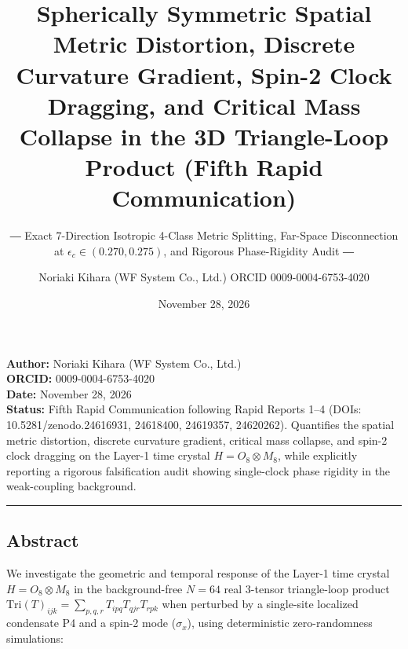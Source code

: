\documentclass[
  a4paper,
]{article}
\title{Spherically Symmetric Spatial Metric Distortion, Discrete
Curvature Gradient, Spin-2 Clock Dragging, and Critical Mass Collapse in
the 3D Triangle-Loop Product (Fifth Rapid Communication)}
\subtitle{― Exact 7-Direction Isotropic 4-Class Metric Splitting,
Far-Space Disconnection at \(\epsilon_c \in (0.270, 0.275)\), and
Rigorous Phase-Rigidity Audit ―}
\author{Noriaki Kihara (WF System Co., Ltd.) ORCID 0009-0004-6753-4020}
\date{November 28, 2026}
\begin{document}
\maketitle

\textbf{Author:} Noriaki Kihara (WF System Co., Ltd.)\\
\textbf{ORCID:} 0009-0004-6753-4020\\
\textbf{Date:} November 28, 2026\\
\textbf{Status:} Fifth Rapid Communication following Rapid Reports 1--4
(DOIs: 10.5281/zenodo.24616931, 24618400, 24619357, 24620262).
Quantifies the spatial metric distortion, discrete curvature gradient,
critical mass collapse, and spin-2 clock dragging on the Layer-1 time
crystal \(H = O_8 \otimes M_8\), while explicitly reporting a rigorous
falsification audit showing single-clock phase rigidity in the
weak-coupling background.

\begin{center}\rule{0.5\linewidth}{0.5pt}\end{center}

\subsection{Abstract}\label{abstract}

We investigate the geometric and temporal response of the Layer-1 time
crystal \(H = O_8 \otimes M_8\) in the background-free \(N = 64\) real
3-tensor triangle-loop product
\(\mathrm{Tri}(T)_{ijk} = \sum_{p,q,r} T_{ipq} T_{qjr} T_{rpk}\) when
perturbed by a single-site localized condensate P4 and a spin-2 mode
(\(\sigma_x\)), using deterministic zero-randomness simulations:
\end{document}
